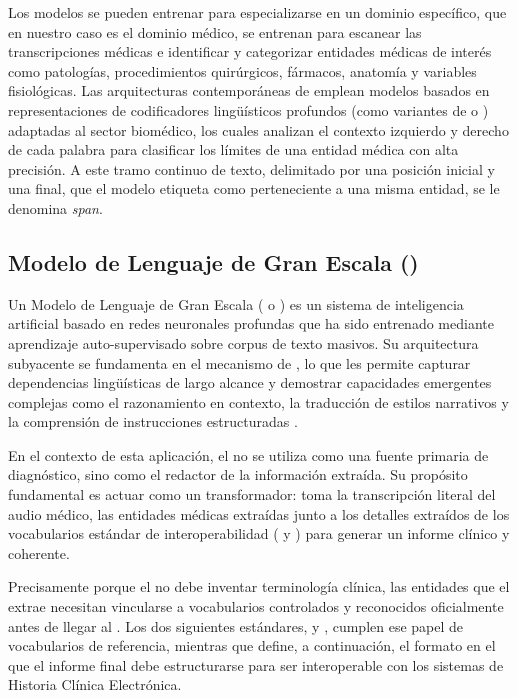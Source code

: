 Los modelos  se pueden entrenar para especializarse en un dominio específico, que en nuestro caso es
el dominio médico, se entrenan para escanear las transcripciones médicas e identificar y categorizar
entidades médicas de interés como patologías, procedimientos quirúrgicos, fármacos, anatomía y variables fisiológicas.
Las arquitecturas contemporáneas de  emplean modelos basados en representaciones de
codificadores lingüísticos profundos (como variantes de  o )
adaptadas al sector biomédico, los cuales analizan el contexto izquierdo y derecho de cada palabra
para clasificar los límites de una entidad médica con alta precisión. A este tramo continuo de texto,
delimitado por una posición inicial y una final, que el modelo etiqueta como perteneciente a una
misma entidad, se le denomina \textit{span}.



\subsection{Modelo de Lenguaje de Gran Escala ()}\label{subsection:llm}

Un Modelo de Lenguaje de Gran Escala ( o ) es un sistema 
de inteligencia artificial basado en redes neuronales profundas que ha sido entrenado mediante aprendizaje 
auto-supervisado sobre corpus de texto masivos. Su arquitectura subyacente se fundamenta en el mecanismo 
de  , lo que les permite capturar dependencias lingüísticas
de largo alcance y demostrar capacidades emergentes complejas como el razonamiento en contexto, la 
traducción de estilos narrativos y la comprensión de instrucciones estructuradas .

En el contexto de esta aplicación, el  no se utiliza como una fuente primaria de diagnóstico, 
sino como el redactor de la información extraída. Su propósito fundamental es actuar como un transformador:
toma la transcripción literal del audio médico, las entidades médicas extraídas 
junto a los detalles extraídos de los vocabularios estándar de interoperabilidad ( y
) para generar un informe clínico y coherente.

Precisamente porque el  no debe inventar terminología clínica, las entidades que el
 extrae necesitan vincularse a vocabularios controlados y reconocidos oficialmente
antes de llegar al . Los dos siguientes estándares,  y
, cumplen ese papel de vocabularios de referencia, mientras que
 define, a continuación, el formato en el que el informe final debe
estructurarse para ser interoperable con los sistemas de Historia Clínica Electrónica.

